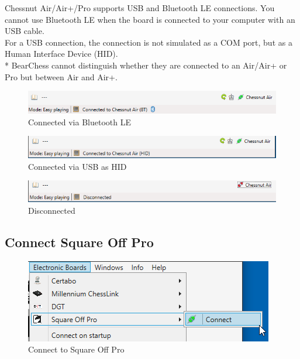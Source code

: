 \documentclass[11pt,a4paper]{article}
\begin{document}
Chessnut Air/Air+/Pro supports USB and Bluetooth LE connections. You cannot use Bluetooth LE when the board is connected to your computer with an USB cable.\\
For a USB connection, the connection is not simulated as a COM port, but as a Human Interface Device (HID).\\
{\color{red}*} BearChess cannot distinguish whether they are connected to an Air/Air+ or Pro but between Air and Air+.

\begin{figure}[H]
	\centering
	\includegraphics[scale=0.7]{ChessnutAir2.png}
	\caption{Connected via Bluetooth LE}
	\label{fig:ChessnutAir2}
\end{figure}


\begin{figure}[H]
	\centering
	\includegraphics[scale=0.7]{ChessnutAir4.png}
	\caption{Connected via USB as HID}
	\label{fig:ChessnutAir4}
\end{figure}



\begin{figure}[H]
	\centering
	\includegraphics[scale=0.7]{ChessnutAir3.png}
	\caption{Disconnected}
	\label{fig:ChessnutAir3}
\end{figure}



\subsection{Connect Square Off Pro} \label{ConfigureSquareOff}
\begin{figure}[H]
	\centering
	\includegraphics[scale=1.0]{SquareOffPro1.png}
	\caption{Connect to Square Off Pro }
	\label{fig:SquareOffPro1}
\end{figure}
\end{document}
